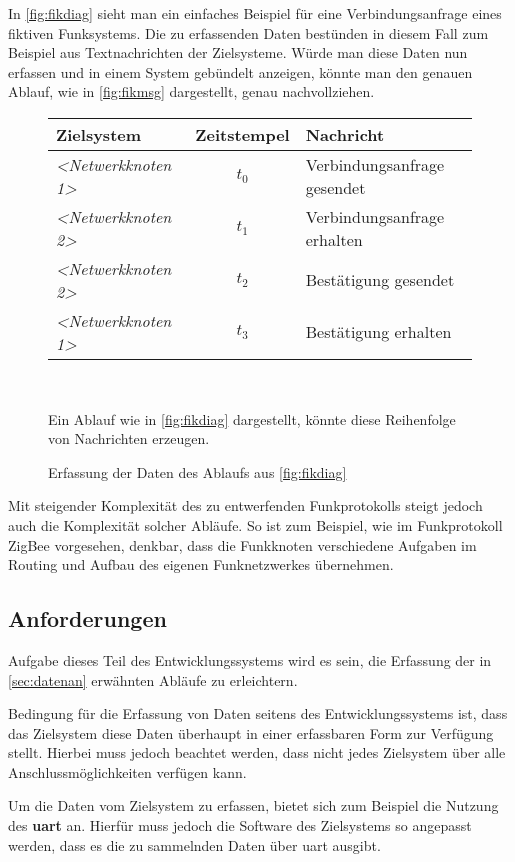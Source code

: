 In \autoref{fig:fikdiag} sieht man ein einfaches Beispiel für eine
Verbindungsanfrage eines fiktiven Funksystems. Die zu erfassenden Daten
bestünden in diesem Fall zum Beispiel aus Textnachrichten der Zielsysteme. Würde
man diese Daten nun erfassen und in einem System gebündelt anzeigen, könnte man
den genauen Ablauf, wie in \autoref{fig:fikmsg} dargestellt, genau
nachvollziehen.
\begin{figure}[ht!]
\centering
\par\begin{tabu}{l c l}
Zielsystem & Zeitstempel & Nachricht\\
\hline
\emph{<Netwerkknoten 1>} & \emph{$t_0$} & Verbindungsanfrage gesendet\\ 
\emph{<Netwerkknoten 2>} & \emph{$t_1$} & Verbindungsanfrage erhalten\\
\emph{<Netwerkknoten 2>} & \emph{$t_2$} & Bestätigung gesendet\\
\emph{<Netwerkknoten 1>} & \emph{$t_3$} & Bestätigung erhalten\\
\hline
\end{tabu}\\
\caption{Erfassung der Daten des Ablaufs aus \autoref{fig:fikdiag}}{Ein Ablauf
wie in \autoref{fig:fikdiag} dargestellt, könnte diese Reihenfolge von
Nachrichten erzeugen.}
\label{fig:fikmsg}
\end{figure}
Mit steigender Komplexität des zu
entwerfenden Funkprotokolls steigt jedoch auch die Komplexität solcher Abläufe.
So ist zum Beispiel, wie im Funkprotokoll ZigBee vorgesehen, denkbar, dass die
Funkknoten verschiedene Aufgaben im Routing und Aufbau des eigenen
Funknetzwerkes übernehmen.

\subsection{Anforderungen}
Aufgabe dieses Teil des Entwicklungssystems wird es sein, die Erfassung der in
\autoref{sec:datenan} erwähnten Abläufe zu erleichtern.

Bedingung für die Erfassung von Daten seitens des Entwicklungssystems ist, dass
das Zielsystem diese Daten überhaupt in einer erfassbaren Form zur Verfügung
stellt. Hierbei muss jedoch beachtet werden, dass nicht jedes Zielsystem über
alle Anschlussmöglichkeiten verfügen kann.

Um die Daten vom Zielsystem zu erfassen, bietet sich zum Beispiel die Nutzung
des \textbf{\gls{uart}} an. Hierfür muss jedoch die Software des Zielsystems so
angepasst werden, dass es die zu sammelnden Daten über \gls{uart} ausgibt.

